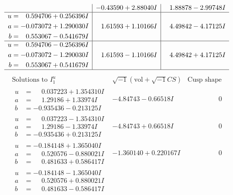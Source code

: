 \documentclass[1p]{elsarticle_modified}
\theoremstyle{definition}
\newcommand{\I}{\sqrt{-1}}
\begin{document}
$$\begin{array}{c|c|c}
 & -0.43590 + 2.88040 I & \phantom{-}1.88878 - 2.99748 I \\ \hline\begin{aligned}
u &= \phantom{-}0.594706 + 0.256396 I \\
a &= -0.073072 + 1.290030 I \\
b &= \phantom{-}0.553067 - 0.541679 I\end{aligned}
 & \phantom{-}1.61593 + 1.10166 I & \phantom{-}4.49842 - 4.17125 I \\ \hline\begin{aligned}
u &= \phantom{-}0.594706 - 0.256396 I \\
a &= -0.073072 - 1.290030 I \\
b &= \phantom{-}0.553067 + 0.541679 I\end{aligned}
 & \phantom{-}1.61593 - 1.10166 I & \phantom{-}4.49842 + 4.17125 I\\
 \hline 
 \end{array}$$\newpage$$\begin{array}{c|c|c}  
\text{Solutions to }I^u_{1}& \I (\text{vol} + \sqrt{-1}CS) & \text{Cusp shape}\\
 \hline 
\begin{aligned}
u &= \phantom{-}0.037223 + 1.354310 I \\
a &= \phantom{-}1.29186 + 1.33974 I \\
b &= -0.935436 - 0.213125 I\end{aligned}
 & -4.84743 - 0.66518 I & \phantom{-0.000000 } 0 \\ \hline\begin{aligned}
u &= \phantom{-}0.037223 - 1.354310 I \\
a &= \phantom{-}1.29186 - 1.33974 I \\
b &= -0.935436 + 0.213125 I\end{aligned}
 & -4.84743 + 0.66518 I & \phantom{-0.000000 } 0 \\ \hline\begin{aligned}
u &= -0.184148 + 1.365040 I \\
a &= \phantom{-}0.520576 - 0.880021 I \\
b &= \phantom{-}0.481633 + 0.586417 I\end{aligned}
 & -1.360140 + 0.220167 I & \phantom{-0.000000 } 0 \\ \hline\begin{aligned}
u &= -0.184148 - 1.365040 I \\
a &= \phantom{-}0.520576 + 0.880021 I \\
b &= \phantom{-}0.481633 - 0.586417 I\end{aligned}

\end{array}$$
\end{document}
